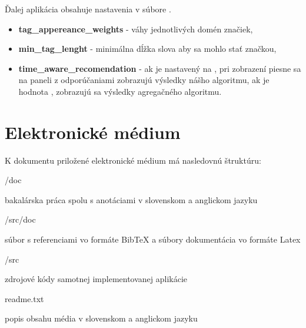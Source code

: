 Ďalej aplikácia obsahuje nastavenia v súbore .

\begin{itemize}
\item{\textbf{tag\_appereance\_weights} - váhy jednotlivých domén značiek,}
\item{\textbf{min\_tag\_lenght} - minimálna dĺžka slova aby sa mohlo stať značkou,}
\item{\textbf{time\_aware\_recomendation} - ak je nastavený na , pri zobrazení
    piesne sa na paneli z odporúčaniami zobrazujú výsledky nášho algoritmu, ak
    je hodnota , zobrazujú sa výsledky agregačného algoritmu.}
\end{itemize}

\section{Elektronické médium}

K dokumentu priložené elektronické médium má nasledovnú štruktúru:
\begin{my_itemize}

\emptyitem /doc
    \begin{my_itemize}
    \myitem bakalárska práca spolu s anotáciami v slovenskom a anglickom jazyku
    \end{my_itemize}

\emptyitem /src/doc
    \begin{my_itemize}
    \myitem súbor s referenciami vo formáte BibTeX a súbory dokumentácia vo formáte Latex
    \end{my_itemize}

\emptyitem /src
    \begin{my_itemize}
    \myitem zdrojové kódy samotnej implementovanej aplikácie
    \end{my_itemize}

\emptyitem readme.txt
    \begin{my_itemize}
    \myitem popis obsahu média v slovenskom a anglickom jazyku
    \end{my_itemize}
\end{my_itemize}

